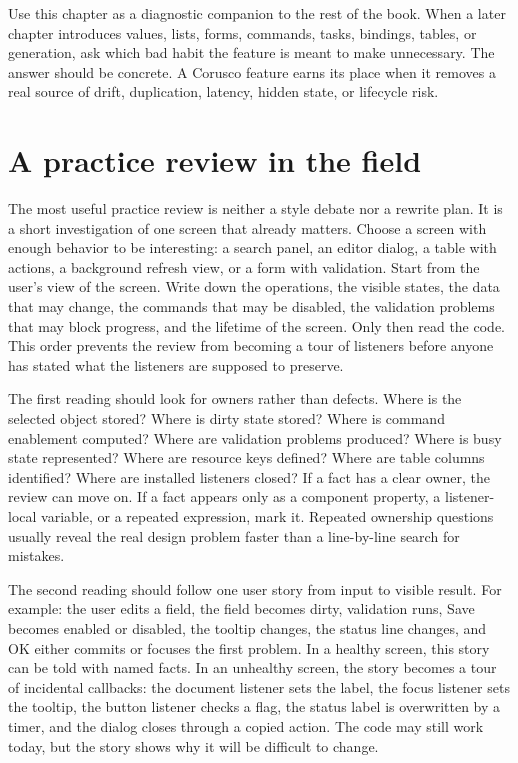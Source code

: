Use this chapter as a diagnostic companion to the rest of the book. When a later
chapter introduces values, lists, forms, commands, tasks, bindings, tables, or
generation, ask which bad habit the feature is meant to make unnecessary. The
answer should be concrete. A Corusco feature earns its place when it removes a
real source of drift, duplication, latency, hidden state, or lifecycle risk.

\section{A practice review in the field}

The most useful practice review is neither a style debate nor a rewrite plan.
It is a short investigation of one screen that already matters. Choose a screen
with enough behavior to be interesting: a search panel, an editor dialog, a
table with actions, a background refresh view, or a form with validation. Start
from the user's view of the screen. Write down the operations, the visible
states, the data that may change, the commands that may be disabled, the
validation problems that may block progress, and the lifetime of the screen.
Only then read the code. This order prevents the review from becoming a tour of
listeners before anyone has stated what the listeners are supposed to preserve.

The first reading should look for owners rather than defects. Where is the
selected object stored? Where is dirty state stored? Where is command
enablement computed? Where are validation problems produced? Where is busy
state represented? Where are resource keys defined? Where are table columns
identified? Where are installed listeners closed? If a fact has a clear owner,
the review can move on. If a fact appears only as a component property, a
listener-local variable, or a repeated expression, mark it. Repeated ownership
questions usually reveal the real design problem faster than a line-by-line
search for mistakes.

The second reading should follow one user story from input to visible result.
For example: the user edits a field, the field becomes dirty, validation runs,
Save becomes enabled or disabled, the tooltip changes, the status line changes,
and OK either commits or focuses the first problem. In a healthy screen, this
story can be told with named facts. In an unhealthy screen, the story becomes a
tour of incidental callbacks: the document listener sets the label, the focus
listener sets the tooltip, the button listener checks a flag, the status label
is overwritten by a timer, and the dialog closes through a copied action. The
code may still work today, but the story shows why it will be difficult to
change.

